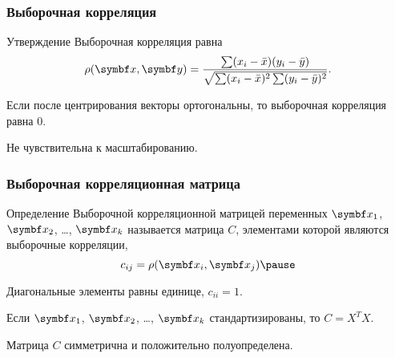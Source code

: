 \begin{frame}
  \frametitle{Выборочная корреляция}

  \begin{block}{Утверждение}
    Выборочная корреляция равна 
    \[
      \rho(\bx, \by) = \frac{\sum (x_i - \bar x)(y_i - \bar y)}{\sqrt{\sum (x_i - \bar x)^2 \sum (y_i - \bar y)^2}}.
    \]
  \end{block}

 
  Если после центрирования векторы ортогональны, то выборочная корреляция равна $0$. \pause

  Не чувствительна к масштабированию.

\end{frame}


\begin{frame}
  \frametitle{Выборочная корреляционная матрица}

  \begin{block}{Определение}
  \alert{Выборочной корреляционной матрицей} переменных $\bx_1$, $\bx_2$, \ldots, $\bx_k$ называется
  матрица $C$, элементами которой являются выборочные корреляции,
  \[
  c_{ij} = \rho(\bx_i, \bx_j) \pause
  \] 
  \end{block}

  Диагональные элементы равны единице, $c_{ii}=1$. \pause

  Если $\bx_1$, $\bx_2$, \ldots, $\bx_k$ стандартизированы, то $C=X^TX$. \pause

  Матрица $C$ симметрична и положительно полуопределена. 

\end{frame}


